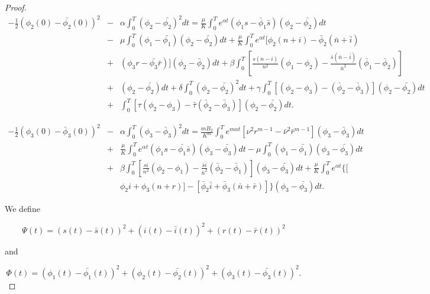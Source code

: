 \begin{proof}
\begin{eqnarray}
-\frac{1}{2}(\phi_2(0)-\bar{\phi_2}(0))^2&-&\alpha\int_{0}^{T}(\phi_2-\bar{\phi_2})^2dt=\frac{\mu}{K}\int_{0}^{T}e^{\alpha
 t}(\phi_1s-\bar{\phi}_1\bar{s})(\phi_2-\bar{\phi_2})dt\nonumber\\
&-&\mu\int_{0}^{T}(\phi_1-\bar{\phi_1})(\phi_2-\bar{\phi_2})dt+\frac{\mu}{K}\int_{0}^{T}e^{\alpha
 t}[\phi_2(n+i)-\bar{\phi}_2(\bar{n}+\bar{i}) \nonumber\\
&+& (\phi_3 
r-\bar{\phi_3}\bar{r})](\phi_2-\bar{\phi}_2)dt+\beta\int_{0}^{T}\left[\frac{s(n-i)}{n^2}(\phi_1-\phi_2)-\frac{\bar{s}(\bar{n}-\bar{i})}{\bar{n}^2}(\bar{\phi}_1-\bar{\phi}_2)\right]
 \nonumber\\
&+&(\phi_2-\bar{\phi_2})dt+\delta\int_{0}^{T}(\phi_2-\bar{\phi_2})^2dt 
+\gamma\int_{0}^{T}[(\phi_2-\phi_3)-(\bar{\phi}_2-\bar{\phi}_3)](\phi_2-\bar{\phi_2})dt
 \nonumber\\
&+&\int_{0}^{T}[\tau(\phi_2-\phi_3)-\bar{\tau}(\bar{\phi}_2-\bar{\phi}_3)](\phi_2-\bar{\phi_2})dt.
 \label{eq.1.4.39}
\end{eqnarray}

\begin{eqnarray}
-\frac{1}{2}(\phi_3(0)-\bar{\phi}_3(0))^2&-&\alpha\int_{0}^{T}(\phi_3-\bar{\phi}_3)^2dt=\frac{m
 B_2}{K^m}\int_{0}^{T}e^{m\alpha 
t}[\nu^2r^{m-1}-\bar{\nu}^2\bar{r}^{m-1}](\phi_3-\bar{\phi}_3)dt\nonumber\\
&+&\frac{\mu}{K}\int_{0}^{T}e^{\alpha t}(\phi_1 
s-\bar{\phi_1}\bar{s})(\phi_3-\bar{\phi_3})dt 
-\mu\int_{0}^{T}(\phi_1-\bar{\phi_1})(\phi_3-\bar{\phi_3})dt\nonumber\\
&+&\beta\int_{0}^{T}\left[\frac{s i}{n^2}(\phi_2-\phi_1)-\frac{\bar{s} 
\bar{i}}{\bar{n}^2}(\bar{\phi}_2-\bar{\phi}_1)\right](\phi_3-\bar{\phi_3})dt+\frac{\mu}{K}\int_{0}^{T}e^{\alpha
 t}\{[ \nonumber\\
&&\phi_2 i+\phi_3(n+r)]-[\bar{\phi}_2 
\bar{i}+\bar{\phi}_3(\bar{n}+\bar{r})]\}(\phi_3-\bar{\phi_3})dt. 
\label{eq.1.4.40}
\end{eqnarray}

We define

\begin{equation*}
	\Psi(t)=(s(t)-\bar{s}(t))^2+(i(t)-\bar{i}(t))^2+(r(t)-\bar{r}(t))^2
\end{equation*}

and

\begin{equation*}
\Phi(t)=(\phi_1(t)-\bar{\phi_1}(t))^2+(\phi_2(t)-\bar{\phi_2}(t))^2+(\phi_3(t)-\bar{\phi_3}(t))^2.
\end{equation*}


\end{proof}
